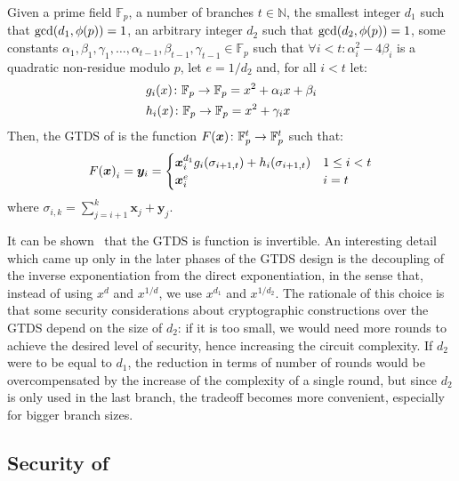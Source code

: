 \begin{definition}\label{def:gtds}
  Given a prime field \(\mathbb{F}_p\), a number of branches \(t \in \mathbb{N}\), the smallest 
  integer \(d_1\) such that \(\call{\gcd}{d_1, \call{\totient}{p}} = 1\), an arbitrary 
  integer \(d_2\) such that \(\call{\gcd}{d_2, \call{\totient}{p}} = 1\), some constants 
  \(\alpha_{1}, \beta_{1}, \gamma_1, \dots, \alpha_{t - 1}, \beta_{t - 1}, \gamma_{t - 1} \in \mathbb{F}_p\) 
  such that \(\forall i < t\colon \alpha_i^2 - 4\beta_i\) is a quadratic non-residue modulo 
  \(p\), let \(e = {1}/{d_2}\) and, for all \(i < t\) let:
  \begin{align*}
    & \call{g_i}{x}\colon \mathbb{F}_p \to \mathbb{F}_p = x^2 + \alpha_{i}x + \beta_{i} \\
    & \call{h_i}{x}\colon \mathbb{F}_p \to \mathbb{F}_p = x^2 + \gamma_{i}x
  \end{align*}
  Then, the GTDS of \Arion{} is the function 
  \(\call{F}{\bm{x}}\colon \mathbb{F}_p^t \to \mathbb{F}_p^t\) such that:
  \[
    \call{F}{\bm{x}}_i = \bm{y}_i = 
    \begin{cases}
      \bm{x}_i^{d_1}\call{g_i}{\sigma_{i+1, t}} + \call{h_i}{\sigma_{i+1, t}} & 1 \le i < t \\
      \bm{x}_i^e & i = t
    \end{cases}
  \]
  where \(\sigma_{i, k} = \sum_{j=i+1}^{k}{\bm{x}_j + \bm{y}_j}\).
\end{definition}

It can be shown~\cite{RoyS2022} that the GTDS is function is invertible.
An interesting detail which came up only in the later phases of the GTDS design is the decoupling 
of the inverse exponentiation from the direct exponentiation, in the sense that, instead of 
using \(x^d\) and \(x^{1/d}\), we use \(x^{d_1}\) and \(x^{1/d_2}\).
The rationale of this choice is that some security considerations about cryptographic constructions
over the GTDS depend on the size of \(d_2\): if it is too small, we would need more rounds to 
achieve the desired level of security, hence increasing the circuit complexity.
If \(d_2\) were to be equal to \(d_1\), the reduction in terms of number of rounds would be 
overcompensated by the increase of the complexity of a single round, but since \(d_2\) is only 
used in the last branch, the tradeoff becomes more convenient, especially for bigger branch sizes.

\subsection{Security of \Arion{}}
